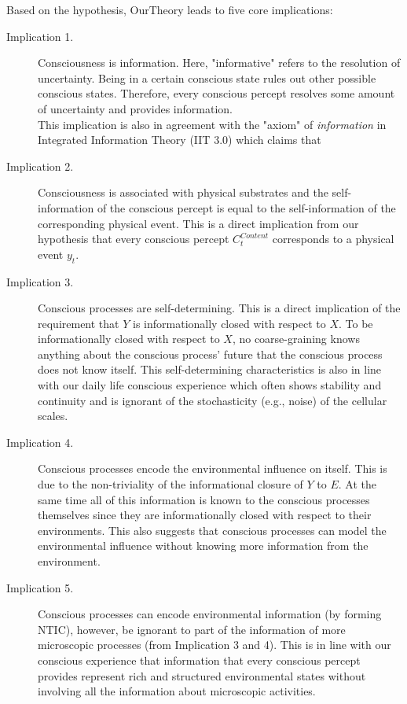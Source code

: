 \documentclass[utf8]{article}
\begin{document}
        Based on the hypothesis, \ac{OurTheory} leads to five core implications: 
        \begin{description}
            \item[Implication 1.] 
            Consciousness is information. Here, "informative" refers to the resolution of uncertainty. Being in a certain conscious state rules out other possible conscious states. Therefore, every conscious percept resolves some amount of uncertainty and provides information. \\ 
            This implication is also in agreement with the "axiom" of \textit{information} in Integrated Information Theory (IIT 3.0) which claims that 
            
            \item[Implication 2.] 
            Consciousness is associated with physical substrates and the self-information of the conscious percept is equal to the self-information of the corresponding physical event. This is a direct implication from our hypothesis that every conscious percept $C_t^{Content}$ corresponds to a physical event $y_t$. 
            
            
            \item[Implication 3.] 
            Conscious processes are self-determining. This is a direct implication of the requirement that $Y$ is informationally closed with respect to $X$. To be informationally closed with respect to $X$, no coarse-graining knows anything about the conscious process' future that the conscious process does not know itself. This self-determining characteristics is also in line with our daily life conscious experience which often shows stability and continuity and is ignorant of the stochasticity (e.g., noise) of the cellular scales.
            

            
            \item[Implication 4.] 
            Conscious processes encode the environmental influence on itself. This is due to the non-triviality of the informational closure of $Y$ to $E$. At the same time all of this information is known to the conscious processes themselves since they are informationally closed with respect to their environments. This also suggests that conscious processes can model the environmental influence without knowing more information from the environment.
            
            \item[Implication 5.]
            Conscious processes can encode environmental information (by forming NTIC), however, be ignorant to part of the information of more microscopic processes (from Implication 3 and 4). This is in line with our conscious experience that information that every conscious percept provides represent rich and structured environmental states without involving all the information about microscopic activities.
        \end{description}
		
\end{document}

